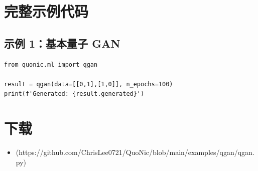 \documentclass[12pt,a4paper]{article}
\begin{document}
\section{完整示例代码}

\subsection{示例 1：基本量子 GAN}

\begin{verbatim}
from quonic.ml import qgan

result = qgan(data=[[0,1],[1,0]], n_epochs=100)
print(f'Generated: {result.generated}')
\end{verbatim}

\section{下载}

\begin{itemize}
  \item [qgan.py](https://github.com/ChrisLee0721/QuoNic/blob/main/examples/qgan/qgan.py)
\end{itemize}
\end{document}
